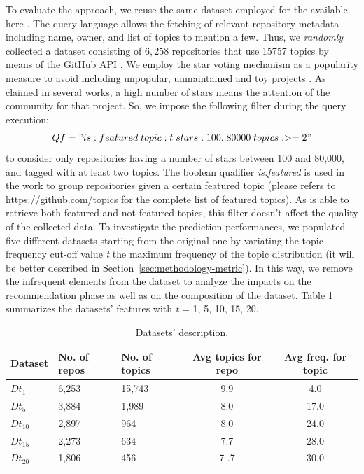 To evaluate the approach, we reuse the same dataset employed for the \MNB available here \cite{MNBreplication}. The \GH query language \cite{understanding} allows the fetching of relevant repository metadata including name, owner, and list of topics to mention a few. Thus, we \emph{randomly} collected a dataset consisting of $6,258$ repositories that use 15757 topics by means of the GitHub API \cite{pygithub/pygithub_2019}. We employ the \GH star voting mechanism as a popularity measure to avoid including unpopular, unmaintained and toy projects \cite{borges_whats_2018}. As claimed in several works\cite{borges_popularity_2017, borges_predicting_2016}, a high number of stars means the attention of the community for that project. So, we impose the following filter during the query execution:
\begin{equation}
\small
Qf = "is:featured \; topic:t \; stars:100..80000 \; topics:>=2"
\end{equation}%
to consider only \GH repositories having a number of stars between 100 and 80,000, and tagged with at least two topics. The boolean qualifier \emph{is:featured} is used in the \MNB work to group repositories given a certain featured topic (please refers to \url{https://github.com/topics} for the complete list of featured topics). As \CT is able to retrieve both featured and not-featured topics, this filter doesn't affect the quality of the collected data.
To investigate the \CT prediction performances, we populated five different datasets starting from the original one by variating the topic frequency cut-off value \emph{t} \ie the maximum frequency of the topic distribution (it will be better described in Section~\ref{sec:methodology-metric}). In this way, we remove the infrequent elements from the dataset to analyze the impacts on the recommendation phase as well as on the composition of the dataset. Table \ref{tab:datasets} summarizes the datasets' features with \emph{t} = 1, 5, 10, 15, 20.


\begin{table}[h]
\centering


\resizebox{8.5cm}{!} {
\begin{tabular}{|l|l|l|c|c|}
\hline
\textbf{Dataset} & \textbf{No. of repos} &\textbf{ No. of topics} & \textbf{Avg topics for repo} & \textbf{Avg freq. for topic} \\ \hline
$Dt_1$  &       6,253      &    15,743       &  9.9  &  4.0         \\ \hline
 $Dt_5$  &        3,884      &    1,989      &     8.0  &   17.0   \\ \hline
$Dt_{10}$  &    2,897         &      964	     &   8.0    &  24.0 \\ \hline
$Dt_{15}$  &    2,273        &   634       &   7.7 &  28.0       \\ \hline
$Dt_{20}$  &    1,806       &   456        &   7 .7 &  30.0       \\ \hline

\end{tabular}
}
\caption{Datasets' description.}
\label{tab:datasets}
\end{table} 

